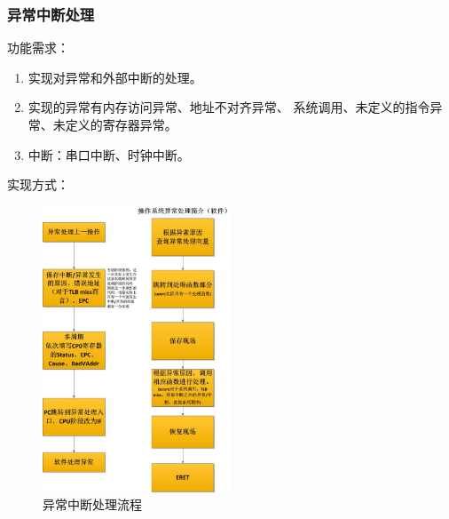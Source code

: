         \subsubsection{异常中断处理}
            功能需求：
            \begin{enumerate}
            \item
            实现对异常和外部中断的处理。
            \item
            实现的异常有内存访问异常、地址不对齐异常、%
            系统调用、未定义的指令异常、未定义的寄存器异常。
            \item
            中断：串口中断、时钟中断。
            \end{enumerate}

            实现方式：
            \begin{figure}[!hbp]
                    \centering
                    \caption{异常中断处理流程}
                    \includegraphics[width=0.5\textwidth]{chart/Exception.jpg}
            \end{figure}
            

